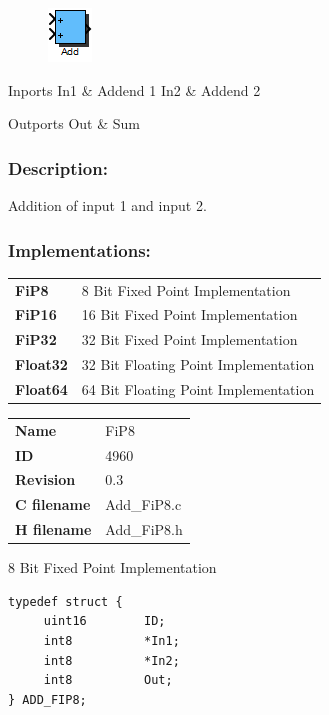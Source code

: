 \label{block:Add}
\begin{figure}[H]\includegraphics{Add}\end{figure} 

\begin{XtoCtabular}{Inports}
In1 & Addend 1\tabularnewline
\hline
In2 & Addend 2\tabularnewline
\hline
\end{XtoCtabular}


\begin{XtoCtabular}{Outports}
Out & Sum\tabularnewline
\hline
\end{XtoCtabular}

\subsubsection*{Description:}
Addition of input 1 and input 2.


\subsubsection*{Implementations:}
\begin{tabular}{l l}
\textbf{FiP8} & 8 Bit Fixed Point Implementation\tabularnewline
\textbf{FiP16} & 16 Bit Fixed Point Implementation\tabularnewline
\textbf{FiP32} & 32 Bit Fixed Point Implementation\tabularnewline
\textbf{Float32} & 32 Bit Floating Point Implementation\tabularnewline
\textbf{Float64} & 64 Bit Floating Point Implementation\tabularnewline
\end{tabular}

\nopagebreak[0]
\begin{tabular}{l l}
\textbf{Name} & FiP8 \tabularnewline
\textbf{ID} & 4960 \tabularnewline
\textbf{Revision} & 0.3 \tabularnewline
\textbf{C filename} & Add\_FiP8.c \tabularnewline
\textbf{H filename} & Add\_FiP8.h \tabularnewline
\end{tabular}
\vspace{1ex}

8 Bit Fixed Point Implementation

\begin{lstlisting}
typedef struct {
     uint16        ID;
     int8          *In1;
     int8          *In2;
     int8          Out;
} ADD_FIP8;
\end{lstlisting}

